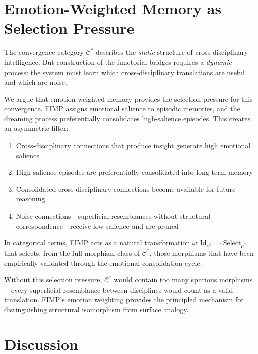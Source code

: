 \documentclass[11pt,a4paper]{article}
\begin{document}
\section{Emotion-Weighted Memory as Selection Pressure}
\label{sec:fimp}

The convergence category $\mathcal{C}^*$ describes the \emph{static} structure of cross-disciplinary intelligence. But construction of the functorial bridges requires a \emph{dynamic} process: the system must learn which cross-disciplinary translations are useful and which are noise.

We argue that emotion-weighted memory \citep{jo2026fimp} provides the selection pressure for this convergence. FIMP assigns emotional salience to episodic memories, and the dreaming process preferentially consolidates high-salience episodes. This creates an asymmetric filter:

\begin{enumerate}[nosep]
  \item Cross-disciplinary connections that produce insight generate high emotional salience
  \item High-salience episodes are preferentially consolidated into long-term memory
  \item Consolidated cross-disciplinary connections become available for future reasoning
  \item Noise connections---superficial resemblances without structural correspondence---receive low salience and are pruned
\end{enumerate}

In categorical terms, FIMP acts as a natural transformation $\omega: \mathrm{Id}_{\mathcal{C}^*} \Rightarrow \mathrm{Select}_{\mathcal{C}^*}$ that selects, from the full morphism class of $\mathcal{C}^*$, those morphisms that have been empirically validated through the emotional consolidation cycle.

Without this selection pressure, $\mathcal{C}^*$ would contain too many spurious morphisms---every superficial resemblance between disciplines would count as a valid translation. FIMP's emotion weighting provides the principled mechanism for distinguishing structural isomorphism from surface analogy.

\section{Discussion}
\label{sec:discussion}
\end{document}
